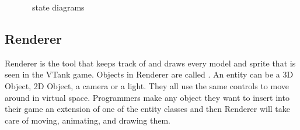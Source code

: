 \begin{figure}
	\centering
	\caption{\Client\ state diagrams}
	\label{fig:clientstate}
\end{figure}

\subsection{Renderer}
Renderer is the tool that keeps track of and draws every model and sprite that is seen in the VTank game. Objects in Renderer are called . An entity can be a 3D Object, 2D Object, a camera or a light. They all use the same controls to move around in virtual space. Programmers make any object they want to insert into their game an extension of one of the entity classes and then Renderer will take care of moving, animating, and drawing them. 

